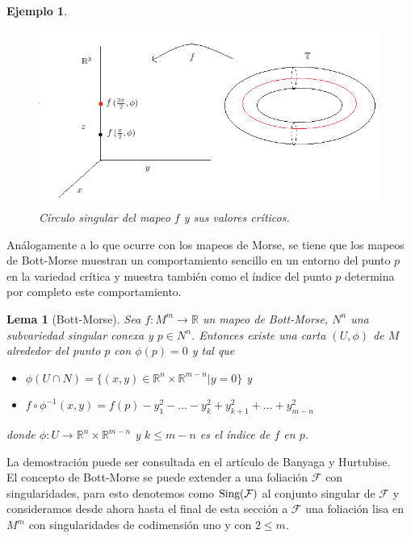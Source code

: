 \documentclass[a4paper,10pt]{book}
\newtheorem{lema}{Lema}[chapter]
\newtheorem{eje}{Ejemplo}[chapter]
\begin{document}
\begin{eje}
\begin{figure}[!ht]
\centering
\includegraphics[scale=0.7]{ToroBottMorse.png}
\caption{C\'irculo singular del mapeo $f$ y sus valores cr\'iticos.}
\label{ToroBottMorse}
\end{figure}

\end{eje}

An\'alogamente a lo que ocurre con los mapeos de Morse, se tiene que los mapeos de Bott-Morse muestran un comportamiento sencillo en un entorno del punto $p$ en la variedad cr\'itica y muestra tambi\'en como el \'indice del punto $p$ determina por completo este comportamiento.

\begin{lema}[Bott-Morse]\label{lemaBM}
Sea $f:M^{m}\to\mathbb{R}$ un mapeo de Bott-Morse, $N^{n}$ una subvariedad singular conexa y $p\in N^{n}$. Entonces existe una carta $(U,\phi)$ de $M$ alrededor del punto $p$ con $\phi(p)=0$ y tal que
\begin{itemize}
	\item $\phi(U\cap N)= \{(x,y)\in\mathbb{R}^{n}\times\mathbb{R}^{m-n}| y=0\}$ y 
	\item $f\circ\phi^{-1}(x,y) = f(p)- y_{1}^{2}-...-y_{k}^{2}+y_{k+1}^{2}+...+y_{m-n}^{2}$
\end{itemize}
donde $\phi:U\to\mathbb{R}^{n}\times\mathbb{R}^{m-n}$ y $k\leq m-n$ es el \'indice de $f$ en $p$.
\end{lema}

La demostraci\'on puede ser consultada en el art\'iculo \cite{Banyaga} de Banyaga y Hurtubise.\\

El concepto de Bott-Morse se puede extender a una foliaci\'on $\mathcal{F}$ con singularidades, para esto denotemos como ${\rm Sing(\mathcal{F})}$ al conjunto singular de $\mathcal{F}$ y consideramos desde ahora hasta el final de esta secci\'on a $\mathcal{F}$ una foliaci\'on lisa en $M^{m}$ con singularidades de codimensi\'on uno y con $2\leq m$.\\
\end{document}
